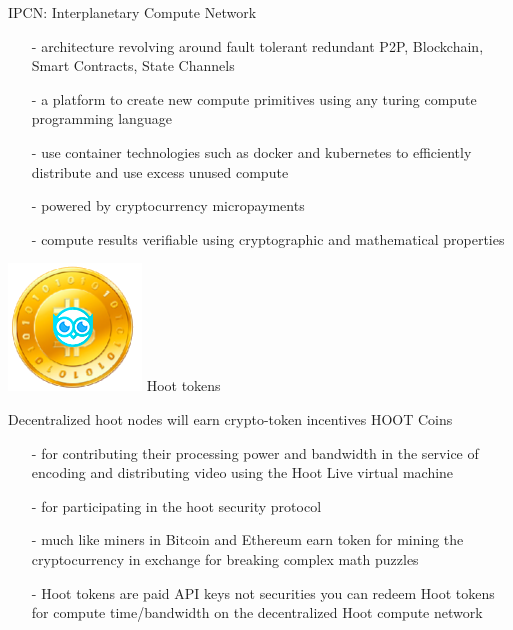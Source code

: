 \documentclass[10pt]{beamer}
\begin{document}
\begin{frame}[t]{IPCN: Interplanetary Compute Network}
    \begin{itemize}
        \item[-]architecture revolving around fault tolerant redundant P2P, Blockchain, Smart Contracts, State Channels
        \item[-]a platform to create new compute primitives using any turing compute programming language
        \item[-]use container technologies such as docker and kubernetes to efficiently distribute and use excess unused compute
        \item[-]powered by cryptocurrency micropayments
        \item[-]compute results verifiable using cryptographic and mathematical properties
    \end{itemize}
\end{frame}

\begin{frame}[t]{ \includegraphics[scale=0.2]{static/hootcoin} Hoot tokens }
    
    
    Decentralized hoot nodes will earn crypto-token incentives HOOT Coins 
    

    \begin{itemize}
    \item[-]for contributing their processing power and bandwidth in the service of encoding and distributing video using the Hoot Live virtual machine 
    \item[-]for participating in the hoot security protocol
    \item[-]much like miners in Bitcoin and Ethereum earn token for mining the cryptocurrency in exchange for breaking complex math puzzles
    \item[-]Hoot tokens are paid API keys not securities you can redeem Hoot tokens for compute time/bandwidth on the decentralized Hoot compute network

    \end{itemize}
    
    
    
\end{frame}
\end{document}
